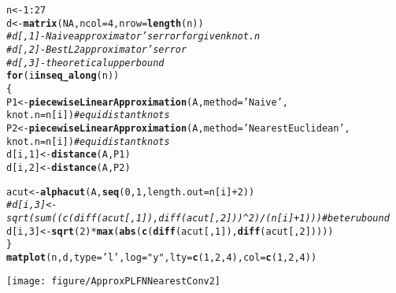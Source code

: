 \documentclass[11pt]{article}\usepackage[]{graphicx}\usepackage[]{color}
\makeatletter
\newcommand{\hlnum}[1]{\textcolor[rgb]{0.686,0.059,0.569}{#1}}%
\newcommand{\hlstr}[1]{\textcolor[rgb]{0.192,0.494,0.8}{#1}}%
\newcommand{\hlcom}[1]{\textcolor[rgb]{0.678,0.584,0.686}{\textit{#1}}}%
\newcommand{\hlopt}[1]{\textcolor[rgb]{0,0,0}{#1}}%
\newcommand{\hlstd}[1]{\textcolor[rgb]{0.345,0.345,0.345}{#1}}%
\newcommand{\hlkwa}[1]{\textcolor[rgb]{0.161,0.373,0.58}{\textbf{#1}}}%
\newcommand{\hlkwb}[1]{\textcolor[rgb]{0.69,0.353,0.396}{#1}}%
\newcommand{\hlkwc}[1]{\textcolor[rgb]{0.333,0.667,0.333}{#1}}%
\newcommand{\hlkwd}[1]{\textcolor[rgb]{0.737,0.353,0.396}{\textbf{#1}}}%
\newenvironment{kframe}{%
 \def\at@end@of@kframe{}%
 \ifinner\ifhmode%
  \def\at@end@of@kframe{\end{minipage}}%
  \begin{minipage}{\columnwidth}%
 \fi\fi%
 \def\FrameCommand##1{\hskip\@totalleftmargin \hskip-\fboxsep
 \colorbox{shadecolor}{##1}\hskip-\fboxsep
     \hskip-\linewidth \hskip-\@totalleftmargin \hskip\columnwidth}%
 \MakeFramed {\advance\hsize-\width
   \@totalleftmargin\z@ \linewidth\hsize
   \@setminipage}}%
 {\par\unskip\endMakeFramed%
 \at@end@of@kframe}
\newenvironment{knitrout}{}{} %
\makeatother
\begin{document}
\begin{knitrout}\small
{}\color{fgcolor}\begin{kframe}
\begin{alltt}
\hlstd{n} \hlkwb{<-} \hlnum{1}\hlopt{:}\hlnum{27}
\hlstd{d} \hlkwb{<-} \hlkwd{matrix}\hlstd{(}\hlnum{NA}\hlstd{,} \hlkwc{ncol}\hlstd{=}\hlnum{4}\hlstd{,} \hlkwc{nrow}\hlstd{=}\hlkwd{length}\hlstd{(n))}
\hlcom{# d[,1] - Naive approximator's error for given knot.n}
\hlcom{# d[,2] - Best L2 approximator's error}
\hlcom{# d[,3] - theoretical upper bound}
\hlkwa{for} \hlstd{(i} \hlkwa{in} \hlkwd{seq_along}\hlstd{(n))}
\hlstd{\{}
   \hlstd{P1} \hlkwb{<-} \hlkwd{piecewiseLinearApproximation}\hlstd{(A,} \hlkwc{method}\hlstd{=}\hlstr{'Naive'}\hlstd{,}
            \hlkwc{knot.n}\hlstd{=n[i])} \hlcom{# equidistant knots}
   \hlstd{P2} \hlkwb{<-} \hlkwd{piecewiseLinearApproximation}\hlstd{(A,} \hlkwc{method}\hlstd{=}\hlstr{'NearestEuclidean'}\hlstd{,}
            \hlkwc{knot.n}\hlstd{=n[i])} \hlcom{# equidistant knots}
   \hlstd{d[i,}\hlnum{1}\hlstd{]} \hlkwb{<-} \hlkwd{distance}\hlstd{(A, P1)}
   \hlstd{d[i,}\hlnum{2}\hlstd{]} \hlkwb{<-} \hlkwd{distance}\hlstd{(A, P2)}

   \hlstd{acut} \hlkwb{<-} \hlkwd{alphacut}\hlstd{(A,} \hlkwd{seq}\hlstd{(}\hlnum{0}\hlstd{,} \hlnum{1}\hlstd{,} \hlkwc{length.out}\hlstd{=n[i]}\hlopt{+}\hlnum{2}\hlstd{))}
   \hlcom{# d[i,3] <- sqrt(sum((c(diff(acut[,1]), diff(acut[,2]))^2)/(n[i]+1))) # beter ubound}
   \hlstd{d[i,}\hlnum{3}\hlstd{]} \hlkwb{<-} \hlkwd{sqrt}\hlstd{(}\hlnum{2}\hlstd{)}\hlopt{*}\hlkwd{max}\hlstd{(}\hlkwd{abs}\hlstd{(}\hlkwd{c}\hlstd{(}\hlkwd{diff}\hlstd{(acut[,}\hlnum{1}\hlstd{]),} \hlkwd{diff}\hlstd{(acut[,}\hlnum{2}\hlstd{]))))}
\hlstd{\}}
\hlkwd{matplot}\hlstd{(n, d,} \hlkwc{type}\hlstd{=}\hlstr{'l'}\hlstd{,} \hlkwc{log}\hlstd{=}\hlstr{"y"}\hlstd{,} \hlkwc{lty}\hlstd{=}\hlkwd{c}\hlstd{(}\hlnum{1}\hlstd{,}\hlnum{2}\hlstd{,}\hlnum{4}\hlstd{),} \hlkwc{col}\hlstd{=}\hlkwd{c}\hlstd{(}\hlnum{1}\hlstd{,}\hlnum{2}\hlstd{,}\hlnum{4}\hlstd{))}
\end{alltt}
\end{kframe}
\end{knitrout}

\begin{center}
\begin{knitrout}\small
{}\color{fgcolor}

{\centering \texttt{[image: figure/ApproxPLFNNearestConv2]} 

}



\end{knitrout}
\end{center}
\end{document}
